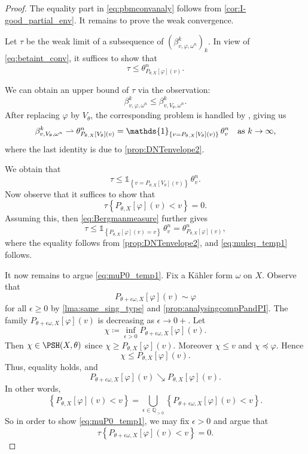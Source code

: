 \begin{proof} The equality part in \eqref{eq:pbmconvanaly} follows from \cref{cor:I-good_partial_env}. It remains to prove the weak convergence.

Let $\tau$ be the weak limit of a subsequence of $(\beta^k_{v,\varphi,\omega^n})_k$. In view of \eqref{eq:betaint_conv}, it suffices to show that
\begin{equation}\label{eq:muleq_temp1}
\tau\leq \theta_{P_{\theta,X}[\varphi](v)}^n.
\end{equation}

We can obtain an upper bound of $\tau$ via the observation:
\[
\beta^k_{v,\varphi,\omega^n} \leq \beta^k_{v,V_{\theta},\omega^n}.
\]
After replacing $\varphi$ by $V_{\theta}$, the corresponding problem is handled by \cite[Theorem~1.2]{Ber11}, giving us
\[
\beta^k_{v,V_{\theta},\omega^n} \rightharpoonup \theta_{P_{\theta,X}[V_{\theta}](v)}^n=\mathds{1}_{\left\{v = P_{\theta,X}[V_{\theta}](v)\right\}}\,\theta_v^n \quad \textup{as }k\to\infty,
\]
where the last identity is due to \cref{prop:DNTenvelope2}.

We obtain that
\begin{equation}\label{eq:Bergmanmeasure}
\tau \leq \mathds{1}_{\left\{v = P_{\theta,X}[V_{\theta}](v)\right\}}\,\theta_v^n.
\end{equation}
Now observe that it suffices to show that
\begin{equation}\label{eq:muP0_temp1}
\tau\left\{P_{\theta,X}[\varphi](v) < v\right\}=0.
\end{equation}
Assuming this, then \eqref{eq:Bergmanmeasure} further gives
\[
\tau \leq \mathds{1}_{\left\{P_{\theta,X}[\varphi](v)= v\right\}}\,\theta_v^n= \theta_{P_{\theta,X}[\varphi](v)}^n,
\]
where the equality follows from \cref{prop:DNTenvelope2}, and \eqref{eq:muleq_temp1} follows.

It now remains to argue \eqref{eq:muP0_temp1}. Fix a Kähler form $\omega$ on $X$. Observe that
\[
P_{\theta +\epsilon \omega,X}[\varphi](v) \sim \varphi
\]
for all $\epsilon\geq 0$ by \cref{lma:same_sing_type} and \cref{prop:analysingcompPandPI}. The family $P_{\theta+\epsilon\omega,X}[\varphi](v)$ is decreasing as $\epsilon\to0+$. Let
\[
    \chi\coloneqq \inf_{\epsilon>0}P_{\theta+\epsilon\omega,X}[\varphi](v).
\]
Then $\chi\in\PSH(X,\theta)$ since $\chi\geq P_{\theta,X}[\varphi](v)$. Moreover $\chi\leq v$ and $\chi\preceq\varphi$. Hence
\[
    \chi\leq P_{\theta,X}[\varphi](v).
\]
Thus, equality holds, and
\[
    P_{\theta+\epsilon\omega,X}[\varphi](v)\searrow P_{\theta,X}[\varphi](v).
\]
In other words,
\[
\left\{P_{\theta,X}[\varphi](v) < v\right\}=\bigcup_{\epsilon\in \mathbb{Q}_{>0}}\left\{P_{\theta+\epsilon\omega,X}[\varphi](v) < v\right\}.
\]
So in order to show \eqref{eq:muP0_temp1}, we may fix $\epsilon>0$ and argue that
\begin{equation}\label{eq:muP0_temp2}
\tau\left\{P_{\theta+\epsilon\omega,X}[\varphi](v) < v\right\}=0.
\end{equation}




\end{proof}

